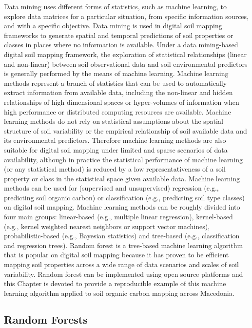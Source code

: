 \documentclass[10pt,b5paper,]{book}
\theoremstyle{definition}
\theoremstyle{definition}
\theoremstyle{definition}
\theoremstyle{remark}
\begin{document}
Data mining uses different forms of statistics, such as machine
learning, to explore data matrices for a particular situation, from
specific information sources, and with a specific objective. Data mining
is used in digital soil mapping frameworks to generate spatial and
temporal predictions of soil properties or classes in places where no
information is available. Under a data mining-based digital soil mapping
framework, the exploration of statistical relationships (linear and
non-linear) between soil observational data and soil environmental
predictors is generally performed by the means of machine learning.
Machine learning methods represent a branch of statistics that can be
used to automatically extract information from available data, including
the non-linear and hidden relationships of high dimensional spaces or
hyper-volumes of information when high performance or distributed
computing resources are available. Machine learning methods do not rely
on statistical assumptions about the spatial structure of soil
variability or the empirical relationship of soil available data and its
environmental predictors. Therefore machine learning methods are also
suitable for digital soil mapping under limited and sparse scenarios of
data availability, although in practice the statistical performance of
machine learning (or any statistical method) is reduced by a low
representativeness of a soil property or class in the statistical space
given available data. Machine learning methods can be used for
(supervised and unsupervised) regression (e.g., predicting soil organic
carbon) or classification (e.g., predicting soil type classes) on
digital soil mapping. Machine learning methods can be roughly divided
into four main groups: linear-based (e.g., multiple linear regression),
kernel-based (e.g., kernel weighted nearest neighbors or support vector
machines), probabilistic-based (e.g., Bayesian statistics) and
tree-based (e.g., classification and regression trees). Random forest is
a tree-based machine learning algorithm that is popular on digital soil
mapping because it has proven to be efficient mapping soil properties
across a wide range of data scenarios and scales of soil variability.
Random forest can be implemented using open source platforms and this
Chapter is devoted to provide a reproducible example of this machine
learning algorithm applied to soil organic carbon mapping across
Macedonia.

\hypertarget{random-forests}{%
\subsection{Random Forests}\label{random-forests}}
\end{document}
